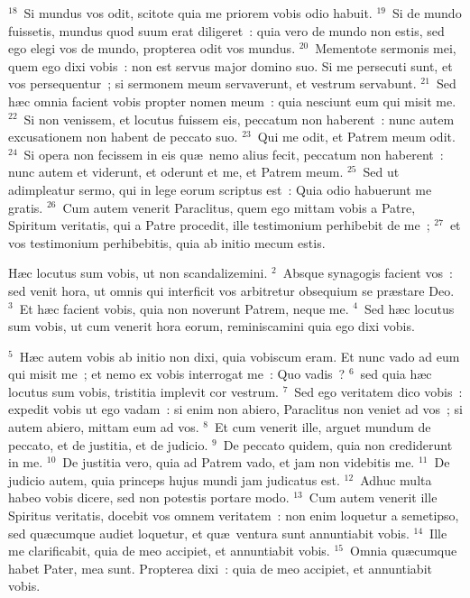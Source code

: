 ${}^{18}$~Si mundus vos odit, scitote quia me priorem vobis odio habuit.
${}^{19}$~Si de mundo fuissetis, mundus quod suum erat diligeret~: quia vero de mundo non estis, sed ego elegi vos de mundo, propterea odit vos mundus.
${}^{20}$~Mementote sermonis mei, quem ego dixi vobis~: non est servus major domino suo. Si me persecuti sunt, et vos persequentur~; si sermonem meum servaverunt, et vestrum servabunt.
${}^{21}$~Sed h\ae c omnia facient vobis propter nomen meum~: quia nesciunt eum qui misit me.
${}^{22}$~Si non venissem, et locutus fuissem eis, peccatum non haberent~: nunc autem excusationem non habent de peccato suo.
${}^{23}$~Qui me odit, et Patrem meum odit.
${}^{24}$~Si opera non fecissem in eis qu\ae\ nemo alius fecit, peccatum non haberent~: nunc autem et viderunt, et oderunt et me, et Patrem meum.
${}^{25}$~Sed ut adimpleatur sermo, qui in lege eorum scriptus est~: Quia odio habuerunt me gratis.
${}^{26}$~Cum autem venerit Paraclitus, quem ego mittam vobis a Patre, Spiritum veritatis, qui a Patre procedit, ille testimonium perhibebit de me~;
${}^{27}$~et vos testimonium perhibebitis, quia ab initio mecum estis.

\lettrine[lines=3,image=true,loversize=0.05,lraise=-0.03]{H}{}\ae c locutus sum vobis, ut non scandalizemini.
${}^{2}$~Absque synagogis facient vos~: sed venit hora, ut omnis qui interficit vos arbitretur obsequium se pr\ae stare Deo.
${}^{3}$~Et h\ae c facient vobis, quia non noverunt Patrem, neque me.
${}^{4}$~Sed h\ae c locutus sum vobis, ut cum venerit hora eorum, reminiscamini quia ego dixi vobis.


${}^{5}$~H\ae c autem vobis ab initio non dixi, quia vobiscum eram. Et nunc vado ad eum qui misit me~; et nemo ex vobis interrogat me~: Quo vadis~?
${}^{6}$~sed quia h\ae c locutus sum vobis, tristitia implevit cor vestrum.
${}^{7}$~Sed ego veritatem dico vobis~: expedit vobis ut ego vadam~: si enim non abiero, Paraclitus non veniet ad vos~; si autem abiero, mittam eum ad vos.
${}^{8}$~Et cum venerit ille, arguet mundum de peccato, et de justitia, et de judicio.
${}^{9}$~De peccato quidem, quia non crediderunt in me.
${}^{10}$~De justitia vero, quia ad Patrem vado, et jam non videbitis me.
${}^{11}$~De judicio autem, quia princeps hujus mundi jam judicatus est.
${}^{12}$~Adhuc multa habeo vobis dicere, sed non potestis portare modo.
${}^{13}$~Cum autem venerit ille Spiritus veritatis, docebit vos omnem veritatem~: non enim loquetur a semetipso, sed qu\ae cumque audiet loquetur, et qu\ae\ ventura sunt annuntiabit vobis.
${}^{14}$~Ille me clarificabit, quia de meo accipiet, et annuntiabit vobis.
${}^{15}$~Omnia qu\ae cumque habet Pater, mea sunt. Propterea dixi~: quia de meo accipiet, et annuntiabit vobis.


